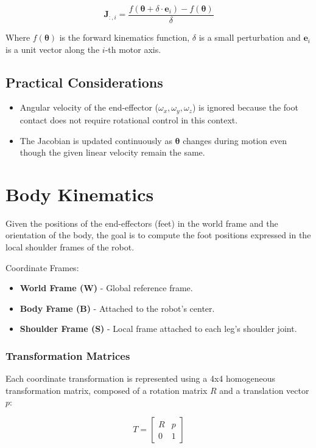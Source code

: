 \documentclass[a4paper,11pt]{article}
\begin{document}
$$
\mathbf{J}_{:,i} = \frac{f(\boldsymbol{\theta} + \delta \cdot \mathbf{e}_i) - f(\boldsymbol{\theta})}{\delta}
$$

Where $f(\boldsymbol{\theta})$ is the forward kinematics function, $\delta$ is a small perturbation and 
$\mathbf{e}_i$ is a unit vector along the $i$-th motor axis.

\subsection*{Practical Considerations}

\begin{itemize}
  \item Angular velocity of the end-effector ($\omega_x, \omega_y, \omega_z$) is ignored because the foot contact does not require rotational control in this context.
  \item The Jacobian is updated continuously as $\boldsymbol{\theta}$ changes during motion even though the given linear velocity remain the same.
\end{itemize}

\section*{Body Kinematics}

Given the positions of the end-effectors (feet) in the world frame and the orientation of the body, the goal is to compute the foot positions expressed in the local shoulder frames of the robot.

Coordinate Frames: 
\begin{itemize}
	\item \textbf{World Frame (W)} - Global reference frame.
	\item \textbf{Body Frame (B)} - Attached to the robot's center.
	\item \textbf{Shoulder Frame (S)} - Local frame attached to each leg's shoulder joint.
\end{itemize}

\subsubsection*{Transformation Matrices}
Each coordinate transformation is represented using a 4x4 homogeneous transformation matrix, composed of a rotation matrix $R$ and a translation vector $p$:

\[
T = \begin{bmatrix}
R & p \\
0 & 1
\end{bmatrix}
\]
\end{document}
